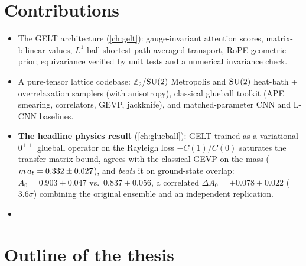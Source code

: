 \section{Contributions}
\label{sec:intro-contributions}

\begin{itemize}
  \item The GELT architecture (\cref{ch:gelt}): gauge-invariant attention
        scores, matrix-bilinear values, $L^1$-ball shortest-path-averaged
        transport, RoPE geometric prior; equivariance verified by unit
        tests and a numerical invariance check.
  \item A pure-tensor lattice codebase: $\mathbb{Z}_2$/$\mathrm{SU}(2)$ Metropolis
        and $\mathrm{SU}(2)$ heat-bath + overrelaxation samplers (with anisotropy),
        classical glueball toolkit (APE smearing, correlators, GEVP,
        jackknife), and matched-parameter CNN and L-CNN baselines.
  \item \textbf{The headline physics result} (\cref{ch:glueball}): GELT
        trained as a variational $0^{++}$ glueball operator on the Rayleigh
        loss $-C(1)/C(0)$ saturates the transfer-matrix bound, agrees with
        the classical GEVP on the mass ($m\,a_t = 0.332 \pm 0.027$), and
        \emph{beats} it on ground-state overlap:
        $A_0 = 0.903 \pm 0.047$ vs.\ $0.837 \pm 0.056$, a correlated
        $\Delta A_0 = +0.078 \pm 0.022$ ($3.6\sigma$) combining the
        original ensemble and an independent replication.
  \item {}
\end{itemize}

\section{Outline of the thesis}
\label{sec:intro-outline}

